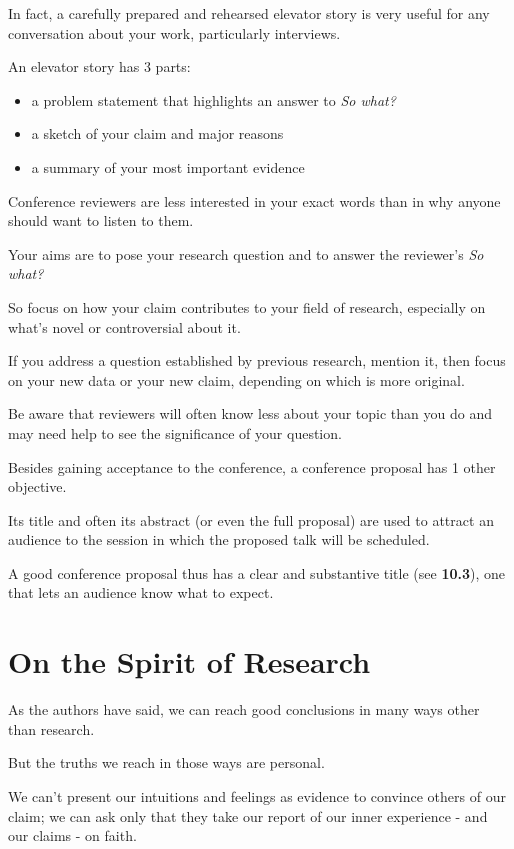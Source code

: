 \documentclass[oneside]{book}
\numberwithin{equation}{section}
\begin{document}
In fact, a carefully prepared and rehearsed elevator story is very useful for any conversation about your work, particularly interviews.

%
An elevator story has 3 parts:
\begin{itemize}
    \item a problem statement that highlights an answer to \textit{So what?}
    \item a sketch of your claim and major reasons
    \item a summary of your most important evidence
\end{itemize}
Conference reviewers are less interested in your exact words than in why anyone should want to listen to them.

Your aims are to pose your research question and to answer the reviewer's \textit{So what?}

So focus on how your claim contributes to your field of research, especially on what's novel or controversial about it.

If you address a question established by previous research, mention it, then focus on your new data or your new claim, depending on which is more original.

Be aware that reviewers will often know less about your topic than you do and may need help to see the significance of your question.

%
Besides gaining acceptance to the conference, a conference proposal has 1 other objective.

Its title and often its abstract (or even the full proposal) are used to attract an audience to the session in which the proposed talk will be scheduled.

A good conference proposal thus has a clear and substantive title (see \textbf{10.3}), one that lets an audience know what to expect.


\chapter{On the Spirit of Research}
As the authors have said, we can reach good conclusions in many ways other than research.

But the truths we reach in those ways are personal.

We can't present our intuitions and feelings as evidence to convince others of our claim; we can ask only that they take our report of our inner experience - and our claims - on faith.
\end{document}

